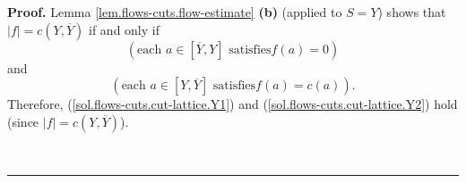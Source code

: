 \documentclass[numbers=enddot,12pt,final,onecolumn,notitlepage]{scrartcl}%
\theoremstyle{definition}
\newenvironment{proof}[1][Proof]{\noindent\textbf{#1.} }{\ \rule{0.5em}{0.5em}}
\begin{document}
\begin{proof}
Lemma \ref{lem.flows-cuts.flow-estimate} \textbf{(b)} (applied to $S=Y$) shows
that $\left\vert f\right\vert =c\left(  Y,\overline{Y}\right)  $ if and only
if
\begin{equation}
\left(  \text{each }a\in\left[  \overline{Y},Y\right]  \text{ satisfies
}f\left(  a\right)  =0\right)  \label{sol.flows-cuts.cut-lattice.Y1}%
\end{equation}
and%
\begin{equation}
\left(  \text{each }a\in\left[  Y,\overline{Y}\right]  \text{ satisfies
}f\left(  a\right)  =c\left(  a\right)  \right)
.\label{sol.flows-cuts.cut-lattice.Y2}%
\end{equation}
Therefore, (\ref{sol.flows-cuts.cut-lattice.Y1}) and
(\ref{sol.flows-cuts.cut-lattice.Y2}) hold (since $\left\vert f\right\vert
=c\left(  Y,\overline{Y}\right)  $).


\end{proof}
\end{document}
